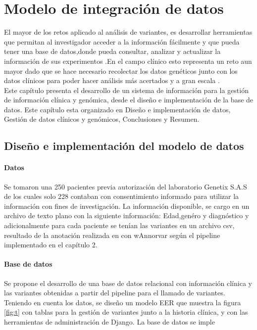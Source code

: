 \chapter{Modelo de integración de datos}

El mayor de los retos aplicado al análisis de variantes, es desarrollar herramientas que permitan al investigador acceder a la información fácilmente y que pueda tener una base de datos,donde pueda consultar, analizar y actualizar la información de sus experimentos \cite{Li2014}.En el campo clínico esto representa un reto aun mayor dado que se hace necesario recolectar los datos genéticos junto con los datos clínicos para poder hacer análisis más acertados y a gran escala \cite{Paila2013}.\\


Este capítulo presenta el desarrollo de un sistema de información para la gestión de información clínica y genómica, desde el diseño e implementación de la base de datos. Este capítulo esta  organizado en Diseño e implementación de datos, Gestión de datos clínicos y genómicos, Conclusiones y  Resumen.

\section{Diseño e implementación del modelo de datos}

\subsubsection{Datos}

Se tomaron una  250 pacientes previa autorización  del laboratorio Genetix S.A.S de los cuales solo 228 contaban con consentimiento informado para utilizar la información con fines de investigación.  La información disponible, se cargo en un archivo de texto plano con la siguiente información: Edad,genéro y diagnóstico y adicionalmente para cada paciente se tenían las variantes en un archivo csv, resultado de la anotación realizada en con wAnnorvar según el pipeline implementado en el capítulo 2.\\

\subsubsection{Base de datos}

Se propone el desarrollo de una base de datos relacional con información clínica  y las variantes obtenidas a partir del pipeline para el llamado de variantes. Teniendo en cuenta los datos, se diseño un modelo EER que muestra la figura \ref{fig:t} con tablas para la gestión de variantes junto a la historia clínica, y con las herramientas de administración de Django.  La base de datos se imple

